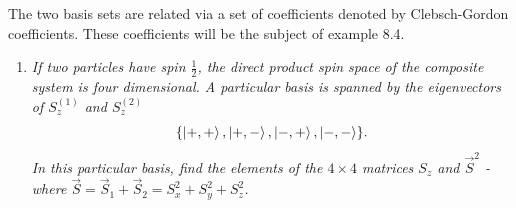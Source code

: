 The two basis sets are related via a set of coefficients denoted by Clebsch-Gordon coefficients. These coefficients will be the subject of example 8.4.

\begin{example}
	\begin{enumerate}
		\item \emph{If two particles have spin $\frac{1}{2}$, the direct product spin space of the composite system is four dimensional. A particular basis is spanned by the eigenvectors of $S^{(1)}_z$ and $S^{(2)}_z$}
		\begin{equation}
			\{\ket{+,+}, \ket{+,-},\ket{-,+},\ket{-,-}\}.
		\end{equation} 
		\emph{In this particular basis, find the elements of the $4\times 4$ matrices $S_z$ and $\vec{S}^2$ - where $\vec{S}=\vec{S}_1+\vec{S}_2=S_x^2+S_y^2+S_z^2$.}\newline
		

\end{enumerate}
\end{example}
